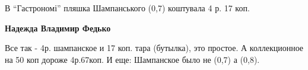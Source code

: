  
 
 
 
 

В \enquote{Гастрономі} пляшка Шампанського (0,7) коштувала 4 р. 17 коп.

\textbf{Надежда Владимир Федько} 

Все так - 4р. шампанское и 17 коп. тара (бутылка), это простое. А коллекционное
на 50 коп дороже 4р.67коп. И еще: Шампанское было не (0,7) а (0,8).
